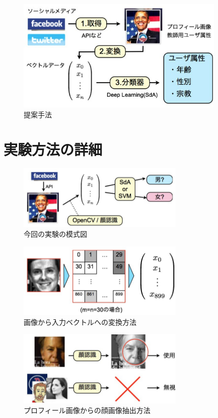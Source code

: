 \begin{figure}[tbp]
 \begin{center}
  \includegraphics[width=100mm]{img/c6/concept}
 \end{center}
 \caption{提案手法}
 \label{c6_concept}
\end{figure}

\section{実験方法の詳細}

\begin{figure}[tbp]
 \begin{center}
  \includegraphics[width=80mm]{img/c6/expr}
 \end{center}
 \caption{今回の実験の模式図}
 \label{c6_expr}
\end{figure}

\begin{figure}[tbp]
 \begin{center}
  \includegraphics[width=80mm]{img/c6/conv}
 \end{center}
 \caption{画像から入力ベクトルへの変換方法}
 \label{c6_conv}
\end{figure}

\begin{figure}[tbp]
 \begin{center}
  \includegraphics[width=80mm]{img/c6/pic_judge}
 \end{center}
 \caption{プロフィール画像からの顔画像抽出方法}
 \label{c6_pic_judge}
\end{figure}

